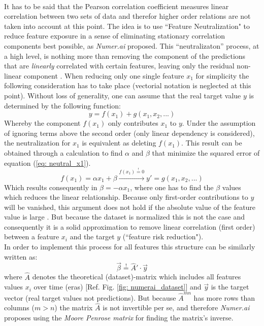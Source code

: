 \documentclass[12pt, a4paper]{article}
\begin{document}
\\
It has to be said that the Pearson correlation coefficient measures linear correlation between two sets of data and therefor higher order relations are not taken into account at this point. The idea is to use ``Feature Neutralization" to reduce feature exposure in a sense of eliminating stationary correlation components best possible, as \textit{Numer.ai} proposed. This ``neutralizaton'' process, at a high level, is nothing more than removing the component of the predictions that are \textit{linearly} correlated with certain features, leaving only the residual non-linear component \cite{Numerai}. When reducing only one single feature $x_1$ for simplicity the following consideration has to take place (vectorial notation is neglected at this point). Without loss of generality, one can assume that the real target value $y$ is determined by the following function:
\begin{equation}
\label{eq: neutral_x1}
    y = f(x_1) + g(x_1, x_2,...)
\end{equation}
Whereby the component $f(x_1)$ only contributes $x_1$ to $y$. Under the assumption of ignoring terms above the second order (only linear dependency is considered), the neutralization for $x_1$ is equivalent as deleting $f(x_1)$. This result can be obtained through a calculation to find $\alpha$ and $\beta$ that minimize the squared error of equation (\ref{eq: neutral_x1}).
\begin{equation}
    \label{eq: neutral_scalar}
    f(x_1) = \alpha x_1 + \beta \xrightarrow{f(x_1) \overset{!}{=} 0} y' = g(x_1,x_2,...)
\end{equation}
Which results consequently in $\beta = - \alpha x_1$, where one has to find the $\beta$ values which reduces the linear relationship. Because only first-order contributions to $y$ will be vanished, this argument does not hold if the absolute value of the feature value is large \cite{Bobyfish2022}. But because the dataset is normalized this is not the case and consequently it is a solid approximation to remove linear correlation (first order) between a feature $x_i$ and the target $y$ (``feature risk reduction").\\
In order to implement this process for all features this structure can be similarly written as:
\begin{equation}
    \vec{\beta} \overset{!}{=} \hat{A}' \cdot \vec{y}
\end{equation}
where $\hat{A}$ denotes the theoretical (dataset)-matrix which includes all features values $x_i$ over time (eras) [Ref. Fig. \ref{fig: numerai_dataset}] and $\vec{y}$ is the target vector (real target values not predictions). But because $\hat{A}^{mn}$ has more rows than columns ($m > n$) the matrix $\hat{A}$ is not invertible per se, and therefore \textit{Numer.ai} \cite{Bobyfish2022} proposes using the \textit{Moore Penrose matrix} for finding the matrix's inverse. \\
\end{document}
